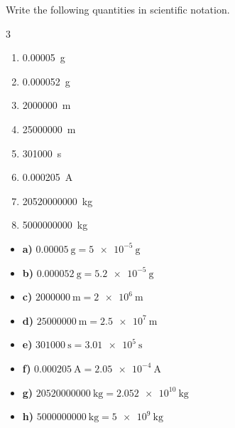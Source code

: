 \begin{exercise}
    Write the following quantities in scientific notation.
    \begin{multicols}{3}
        \begin{enumerate}[label=\letraminuscula]
\item \qty{0.00005}{\g}
\item \qty{0.000052}{\g}
\item \qty{2000000}{\m}
\item \qty{25000000}{\m}
\item \qty{301000}{\s}
\item \qty{0.000205}{\ampere}
\item \qty{20520000000}{\kg}
\item \qty{5000000000}{\kg}
        \end{enumerate}
    \end{multicols}

    \begin{solu}
        \begin{itemize}
            \item \textbf{a)} \( \qty{0.00005}{\g} = \qty{5e-5}{\g} \)
            \item \textbf{b)} \( \qty{0.000052}{\g} = \qty{5.2e-5}{\g} \)
            \item \textbf{c)} \( \qty{2000000}{\m} = \qty{2e6}{\m} \)
            \item \textbf{d)} \( \qty{25000000}{\m} = \qty{2.5e7}{\m} \)
            \item \textbf{e)} \( \qty{301000}{\s} = \qty{3.01e5}{\s} \)
            \item \textbf{f)} \( \qty{0.000205}{\ampere} = \qty{2.05e-4}{\ampere} \)
            \item \textbf{g)} \( \qty{20520000000}{\kg} = \qty{2.052e10}{\kg} \)
            \item \textbf{h)} \( \qty{5000000000}{\kg} = \qty{5e9}{\kg} \)
        \end{itemize}
    \end{solu}

\end{exercise}

